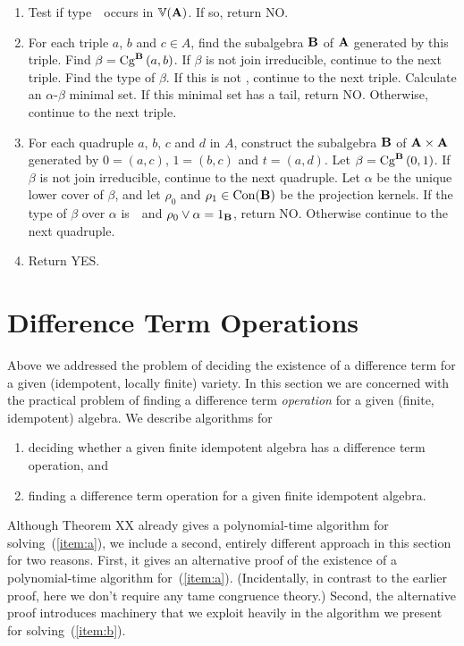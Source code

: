 \begin{enumerate}
\item
Test if type~\utyp\ occurs in $\bbV(\alg A)$. If so, return NO.

\item
For each triple $a$, $b$ and $c\in A$, find the subalgebra 
$\alg B$ of $\alg A$ generated by this triple. Find 
$\beta = \Cga a b{B}$. If $\beta$ is not join irreducible,
continue to the next triple. Find the type of $\beta$. If this
is not \atyp, continue to the next triple. Calculate an
$\alpha$-$\beta$ minimal set. If this minimal set has a 
tail, return NO. Otherwise, continue to the next triple.

\item
For each quadruple  $a$, $b$, $c$ and $d$ in $A$, construct 
the subalgebra $\alg B$ of 
$\alg A \times \alg A$ generated by $0 = (a, c)$, $1 = (b,c)$ 
and $t = (a,d)$.
Let $\beta = \Cga01{B}$.
If $\beta$ is not join irreducible, continue to the next quadruple.
Let $\alpha$ be the unique lower cover of $\beta$, 
and let $\rho_0$ and 
$\rho_1 \in \op{Con}(\alg B)$ be the projection kernels. 
If the type of $\beta$ over $\alpha$
is~\atyp\ and $\rho_0 \join \alpha = 1_{\alg B}$, return NO.
Otherwise continue to the next quadruple.
\item
Return YES.
\end{enumerate}





\section{Difference Term Operations}
Above we addressed the problem of deciding the existence of a difference term 
for a given (idempotent, locally finite) variety.  In this section we are 
concerned with the practical problem of finding a difference term 
\emph{operation} for a given (finite, idempotent) algebra.
We describe algorithms for
\begin{enumerate}
\item \label{item:a} deciding whether a given finite idempotent algebra 
has a difference term operation, and 
\item \label{item:b} finding a difference term operation 
for a given finite idempotent algebra.
\end{enumerate}
Although Theorem XX already gives a polynomial-time algorithm
for solving~(\ref{item:a}), we include a second, entirely different 
approach in this section for two reasons.  First, it gives an 
alternative proof of the existence of a polynomial-time algorithm 
for~(\ref{item:a}). (Incidentally, in contrast to the earlier proof, 
here we don't require any tame congruence theory.)  
Second, the alternative proof introduces machinery
that we exploit heavily in the algorithm we present 
for solving~(\ref{item:b}).






